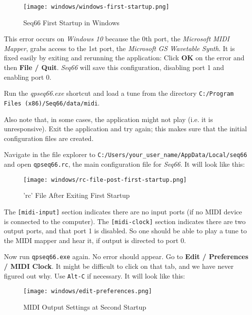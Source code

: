 \begin{figure}[H]
   \centering 
   \texttt{[image: windows/windows-first-startup.png]}
   \caption{Seq66 First Startup in Windows}
   \label{fig:windows_first_startup}
\end{figure}

   This error occurs on \textsl{Windows 10} because the 0th port, the
   \textsl{Microsoft MIDI Mapper}, grabs access to the 1st port, the
   \textsl{Microsoft GS Wavetable Synth}.  It is fixed easily by exiting
   and rerunning the application:
   Click \textbf{OK} on the error and then \textbf{File / Quit}.
   \textsl{Seq66} will save this configuration, disabling port 1 and
   enabling port 0.

   Run the \textsl{qpseq66.exe} shortcut and load a tune from the
   directory \texttt{C:/Program Files (x86)/Seq66/data/midi}.

   Also note that, in some cases, the application might not play (i.e. it is
   unresponsive).  Exit the application and try again; this makes sure that the
   initial configuration files are created.

   Navigate in the file explorer to
   \texttt{C:/Users/your\_user\_name/AppData/Local/seq66} and open
   \texttt{qpseq66.rc}, the main configuration file for \textsl{Seq66}.
   It will look like this:

\begin{figure}[H]
   \centering 
   \texttt{[image: windows/rc-file-post-first-startup.png]}
   \caption{'rc' File After Exiting First Startup}
   \label{fig:windows_rc_file_post_first_startup}
\end{figure}

   The \texttt{[midi-input]} section indicates there are no input ports
   (if no MIDI device is connected to the computer).
   The \texttt{[midi-clock]} section indicates there are two output
   ports, and that port 1 is disabled.   So one should be able to
   play a tune to the MIDI mapper and hear it, if output is directed
   to port 0.

   Now run \texttt{qpseq66.exe} again.  No error should appear.
   Go to \textbf{Edit / Preferences / MIDI Clock}.  It might be
   difficult to click on that tab, and we have never figured out why.
   Use \texttt{Alt-C} if necessary.
   It will look like this:

\begin{figure}[H]
   \centering 
   \texttt{[image: windows/edit-preferences.png]}
   \caption{MIDI Output Settings at Second Startup}
   \label{fig:windows_output_settings_second_startup}
\end{figure}

